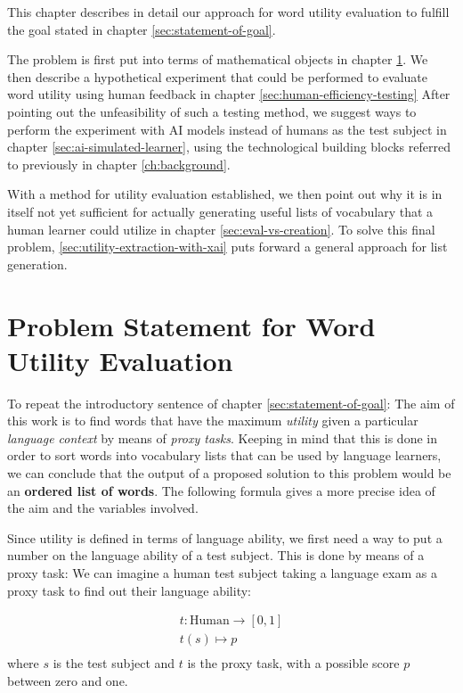 This chapter describes in detail our approach for word utility evaluation to fulfill the goal stated in chapter \ref{sec:statement-of-goal}.

The problem is first put into terms of mathematical objects in chapter \ref{sec:problem-statement-formal}.
We then describe a hypothetical experiment that could be performed to evaluate word utility using human feedback in chapter \ref{sec:human-efficiency-testing}
After pointing out the unfeasibility of such a testing method, we suggest ways to perform the experiment with AI models instead of humans as the test subject in chapter \ref{sec:ai-simulated-learner}, using the technological building blocks referred to previously in chapter \ref{ch:background}.

With a method for utility evaluation established, we then point out why it is in itself not yet sufficient for actually generating useful lists of vocabulary that a human learner could utilize in chapter \ref{sec:eval-vs-creation}.
To solve this final problem, \ref{sec:utility-extraction-with-xai} puts forward a general approach for list generation.

\section{Problem Statement for Word Utility Evaluation} \label{sec:problem-statement-formal}


To repeat the introductory sentence of chapter \ref{sec:statement-of-goal}:
The aim of this work is to find words that have the maximum \textit{utility} given a particular \textit{language context} by means of \textit{proxy tasks}.
Keeping in mind that this is done in order to sort words into vocabulary lists that can be used by language learners, we can conclude that the output of a proposed solution to this problem would be an \textbf{ordered list of words}. The following formula gives a more precise idea of the aim and the variables involved.

Since utility is defined in terms of language ability, we first need a way to put a number on the language ability of a test subject. This is done by means of a proxy task: We can imagine a human test subject taking a language exam as a proxy task to find out their language ability:

\begin{align*}
	t: \text{Human} \to [0, 1] \\
	t (s) \mapsto p            \\
\end{align*}
where $s$ is the test subject and $t$ is the proxy task, with a possible score $p$ between zero and one.

